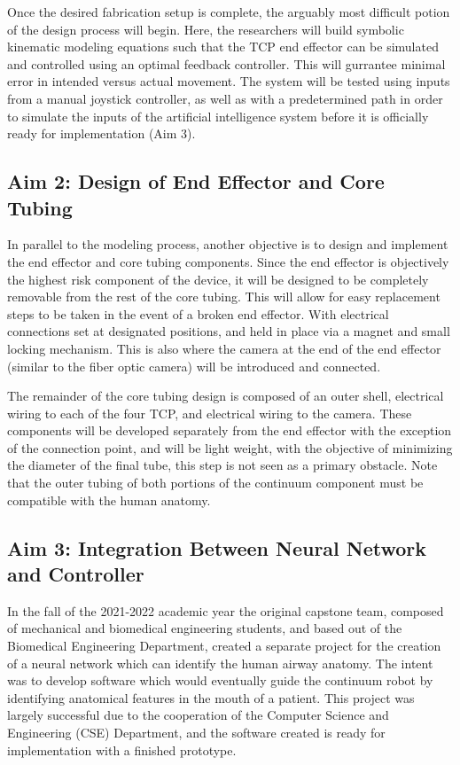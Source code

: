		Once the desired fabrication setup is complete, the arguably most difficult potion of the design process will begin. Here, the researchers will build symbolic kinematic modeling equations such that the TCP end effector can be simulated and controlled using an optimal feedback controller. This will gurrantee minimal error in intended versus actual movement. The system will be tested using inputs from a manual joystick controller, as well as with a predetermined path in order to simulate the inputs of the artificial intelligence system before it is officially ready for implementation (Aim 3).
	
	\subsection{Aim 2: Design of End Effector and Core Tubing}
	\label{subsect:aim2}
	
		In parallel to the modeling process, another objective is to design and implement the end effector and core tubing components. Since the end effector is objectively the highest risk component of the device, it will be designed to be completely removable from the rest of the core tubing. This will allow for easy replacement steps to be taken in the event of a broken end effector. With electrical connections set at designated positions, and held in place via a magnet and small locking mechanism.	 This is also where the camera at the end of the end effector (similar to the fiber optic camera) will be introduced and connected.
	
		The remainder of the core tubing design is composed of an outer shell, electrical wiring to each of the four TCP, and electrical wiring to the camera. These components will be developed separately from the end effector with the exception of the connection point, and will be light weight, with the objective of minimizing the diameter of the final tube, this step is not seen as a primary obstacle. Note that the outer tubing of both portions of the continuum component must be compatible with the human anatomy.
	
	\subsection{Aim 3: Integration Between Neural Network and Controller}
	\label{subsect:aim3}
	
		In the fall of the 2021-2022 academic year the original capstone team, composed of mechanical and biomedical engineering students, and based out of the Biomedical Engineering Department, created a separate project for the creation of a neural network which can identify the human airway anatomy. The intent was to develop software which would eventually guide the continuum robot by identifying anatomical features in the mouth of a patient. This project was largely successful due to the cooperation of the Computer Science and Engineering (CSE) Department, and the software created is ready for implementation with a finished prototype.
	
